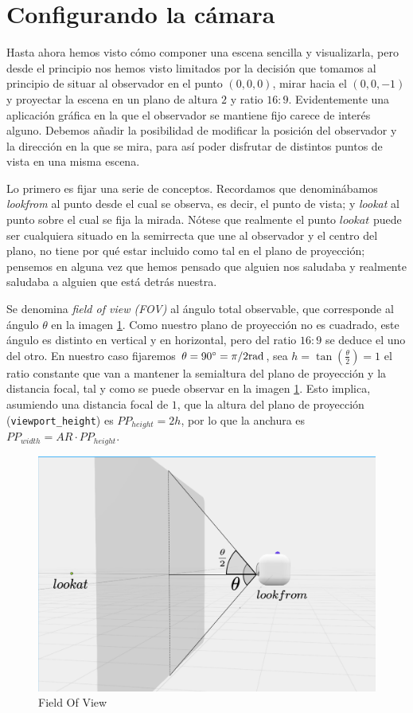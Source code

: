 \section{Configurando la cámara}
\label{section:camara}

Hasta ahora hemos visto cómo componer una escena sencilla y visualizarla, pero desde el principio nos hemos visto limitados por la decisión que tomamos al principio de situar al observador en el punto $(0,0,0)$, mirar hacia el $(0,0,-1)$ y proyectar la escena en un plano de altura $2$ y ratio $16:9$. Evidentemente una aplicación gráfica en la que el observador se mantiene fijo carece de interés alguno. Debemos añadir la posibilidad de modificar la posición del observador y la dirección en la que se mira, para así poder disfrutar de distintos puntos de vista en una misma escena.

Lo primero es fijar una serie de conceptos. Recordamos que denominábamos \textit{lookfrom} al punto desde el cual se observa, es decir, el punto de vista; y \textit{lookat} al punto sobre el cual se fija la mirada. Nótese que realmente el punto $lookat$ puede ser cualquiera situado en la semirrecta que une al observador y el centro del plano, no tiene por qué estar incluido como tal en el plano de proyección; pensemos en alguna vez que hemos pensado que alguien nos saludaba y realmente saludaba a alguien que está detrás nuestra.

Se denomina \textit{field of view (FOV)} al ángulo total observable, que corresponde al ángulo $\theta$ en la imagen \ref{fig:fov}. Como nuestro plano de proyección no es cuadrado, este ángulo es distinto en vertical y en horizontal, pero del ratio $16:9$ se deduce el uno del otro. En nuestro caso fijaremos $\theta=90^\circ=\pi/2 \mathrm{rad}$, sea $h=\tan\left(\frac \theta 2\right)=1$ el ratio constante que van a mantener la semialtura del plano de proyección y la distancia focal, tal y como se puede observar en la imagen \ref{fig:fov}. Esto implica, asumiendo una distancia focal de $1$, que la altura del plano de proyección (\verb|viewport_height|) es $PP_{height}=2h$, por lo que la anchura es $PP_{width}=AR\cdot PP_{height}$. 

\begin{figure} [ht]
    \centering
    \includegraphics[scale = 0.25]{img/C7/fov.png}
    \caption{Field Of View}
    \label{fig:fov}
\end{figure}

